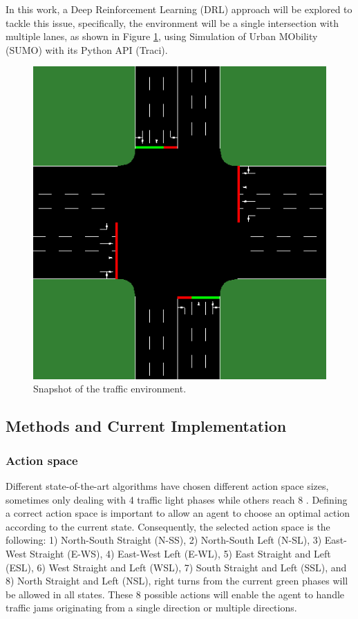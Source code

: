 \documentclass{Supervised_Reinforcement_Learningqsport}
\begin{document}
In this work, a Deep Reinforcement Learning (DRL) approach will be explored to tackle this issue, specifically, the environment will be a single intersection with multiple lanes, as shown in Figure \ref{fig:snap}, using Simulation of Urban MObility (SUMO) with its Python API (Traci).

\begin{figure}[htbp]
   \centerline{\includegraphics[width=0.5\columnwidth]{snap_envSUMO.png}}
    \caption{Snapshot of the traffic environment.}
    \label{fig:snap}
\end{figure}

\subsection{Methods and Current Implementation}

\subsubsection{Action space}

Different state-of-the-art algorithms have chosen different action space sizes, sometimes only dealing with 4 traffic light phases \cite{ref2}\cite{ref3} while others reach 8 \cite{ref1}\cite{ref4}. Defining a correct action space is important to allow an agent to choose an optimal action according to the current state. Consequently, the selected action space is the following: 1) North-South Straight (N-SS), 2) North-South Left (N-SL), 3) East-West Straight (E-WS), 4) East-West Left (E-WL), 5) East Straight and Left (ESL), 6) West Straight and Left (WSL), 7) South Straight and Left (SSL), and 8) North Straight and Left (NSL), right turns from the current green phases will be allowed in all states. These 8 possible actions will enable the agent to handle traffic jams originating from a single direction or multiple directions.
\end{document}
